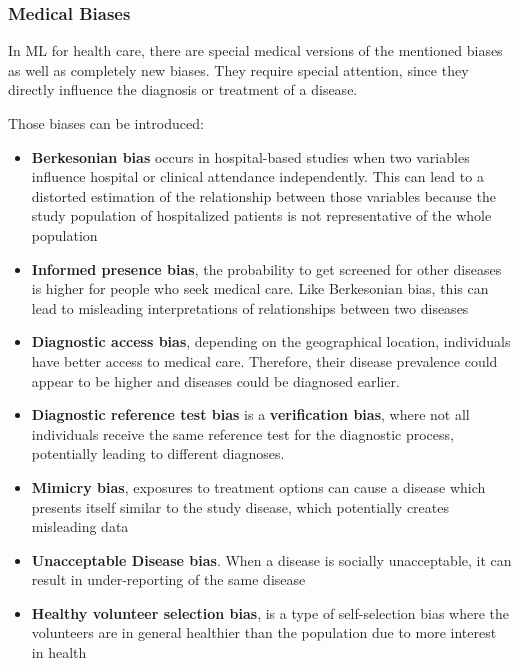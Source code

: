 \documentclass[12pt, a4paper, oneside]{book}   	%
\renewcommand{\paragraph}[1]{%
	\subsubsection*{#1}%
}
\begin{document}
			\paragraph{Medical Biases}
			In \gls{ML} for health care, there are special medical versions of the mentioned biases as well as completely new biases. They require special attention, since they directly influence the diagnosis or treatment of a disease.
			
			Those biases can be introduced:
			\begin{itemize}
				\item \textbf{Berkesonian bias} occurs in hospital-based studies when two variables influence hospital or clinical attendance independently. This can lead to a distorted estimation of the relationship between those variables because the study population of hospitalized patients is not representative of the whole population \autocite{Chakraborty_2024, c3, c7}
				\item \textbf{Informed presence bias}, the probability to get screened for other diseases is higher for people who seek medical care. Like Berkesonian bias, this can lead to misleading interpretations of relationships between two diseases \autocite{Chakraborty_2024, c27, c23}
				\item \textbf{Diagnostic access bias}, depending on the geographical location, individuals have better access to medical care. Therefore, their disease prevalence could appear to be higher and diseases could be diagnosed earlier. \autocite{Chakraborty_2024, c19-c21}
				\item \textbf{Diagnostic reference test bias} is a \textbf{verification bias}, where not all individuals receive the same reference test for the diagnostic process, potentially leading to different diagnoses. \autocite{Chakraborty_2024, c21}
				\item \textbf{Mimicry bias}, exposures to treatment options can cause a disease which presents itself similar to the study disease, which potentially creates misleading data \autocite{Chakraborty_2024, c28, c25}
				\item \textbf{Unacceptable Disease bias}. When a disease is socially unacceptable, it can result in under-reporting of the same disease \autocite{Chakraborty_2024, c30, c27}
				\item \textbf{Healthy volunteer selection bias}, is a type of self-selection bias where the volunteers are in general healthier than the population due to more interest in health \autocite{Delgado-Rodriguez_2004}
			\end{itemize}
			
\end{document}
